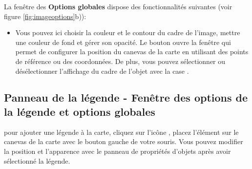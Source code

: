 
La fenêtre des \textbf{Options globales} dispose des fonctionnalités suivantes (voir figure \ref{fig:imageoptions}b)):

\begin{itemize}[label=--]
\item Vous pouvez ici choisir la couleur et le contour du cadre de l'image, mettre une couleur de fond et gérer son opacité. Le bouton  ouvre la fenêtre  qui permet de configurer la position du canevas de la carte en utilisant des points de référence ou des coordonnées. De plus, vous pouvez sélectionner ou désélectionner l'affichage du cadre de l'objet avec la case .
\end{itemize}

\subsection{Panneau de la légende - Fenêtre des options de la légende et options globales}

pour ajouter une légende à la carte, cliquez sur l'icône , placez l'élément sur le canevas de la carte avec le bouton gauche de votre souris. Vous pouvez modifier la position et l'apparence avec le panneau de propriétés d'objets après avoir sélectionné la légende.

